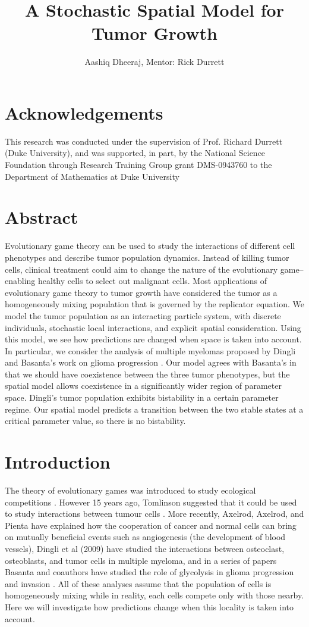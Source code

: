 \documentclass[12pt]{report}
\title{A Stochastic Spatial Model for Tumor Growth}
\author{Aashiq Dheeraj, Mentor: Rick Durrett}
\begin{document}
\maketitle

\chapter*{Acknowledgements}
This research was conducted under the supervision of Prof. Richard Durrett (Duke University), and was supported, in part, by the National Science Foundation through Research Training Group grant DMS-0943760 to the Department of Mathematics at
Duke University
\newpage

\chapter*{Abstract}
Evolutionary game theory can be used to study the interactions of different cell phenotypes and describe tumor population dynamics. Instead of killing tumor cells, clinical treatment could aim to change the nature of the evolutionary game-- enabling healthy cells to select out malignant cells. Most applications of  evolutionary game theory to tumor growth have considered the tumor as a homogeneously mixing population that is governed by the replicator equation. We model the tumor population as an interacting particle system, with discrete individuals, stochastic local interactions, and explicit spatial consideration. Using this model, we see how predictions are changed when space is taken into account. In particular, we consider the analysis of multiple myelomas proposed by Dingli \cite{Dingli2009} and Basanta's work on glioma progression \cite{Basanta2008}. Our model agrees with Basanta's in that we should have coexistence between the three tumor phenotypes, but the spatial model allows coexistence in a significantly wider region of parameter space. Dingli's tumor population exhibits bistability in a certain parameter regime. Our spatial model predicts a transition between the two stable states at a critical parameter value, so there is no bistability. 

\chapter*{Introduction}
	The theory of evolutionary games was introduced to study ecological competitions \cite{Smith1986}. However 15 years ago, Tomlinson suggested that it could be used to study interactions between tumour cells \cite{Tomlinson1997,TomBod}. More recently, Axelrod, Axelrod, and Pienta  \cite{Axelrod2006} have explained how the cooperation of cancer and normal cells can bring on mutually beneficial events such as angiogenesis (the development of blood vessels), Dingli et al (2009) have studied the interactions between osteoclast, osteoblasts, and tumor cells in multiple myeloma, and in a series of papers Basanta and coauthors have studied the role of glycolysis in glioma progression and invasion \cite{Basanta2008,Basanta2011}. All of these analyses assume that the population of cells is homogeneously mixing while in reality, each cells compete only with those nearby. Here we will investigate how predictions change when this locality is taken into account.
	
\end{document}
